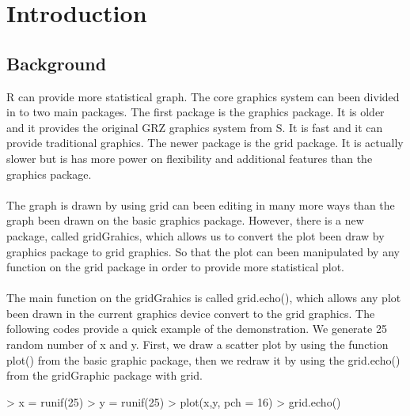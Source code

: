 \documentclass[a4paper,10pt]{article}
\begin{document}


\section{Introduction}
\subsection{Background}
R can provide more statistical graph. The core graphics system can been divided in to two main packages. The first package is the graphics package. It is older and it provides the original GRZ graphics system from S. It is fast and it can provide traditional graphics. The newer package is the grid package. It is actually slower but is has more power on flexibility and additional features than the graphics package. \\\\
The graph is drawn by using grid can been editing in many more ways than the graph been drawn on the basic graphics package. However, there is a new package, called gridGrahics, which allows us to convert the plot been draw by graphics package to grid graphics. So that the plot can been manipulated by any function on the grid package in order to provide more statistical plot. \\\\
The main function on the gridGrahics is called grid.echo(), which allows any plot been drawn in the current graphics device convert to the grid graphics. The following codes provide a quick example of the demonstration. We generate 25 random number of x and y. First, we draw a scatter plot by using the function plot() from the basic graphic package, then we redraw it by using the grid.echo() from the gridGraphic package with grid.
\begin{Schunk}
\begin{Sinput}
> x = runif(25)
> y = runif(25)
> plot(x,y, pch = 16)
> grid.echo()
\end{Sinput}
\end{Schunk}
\end{document}
